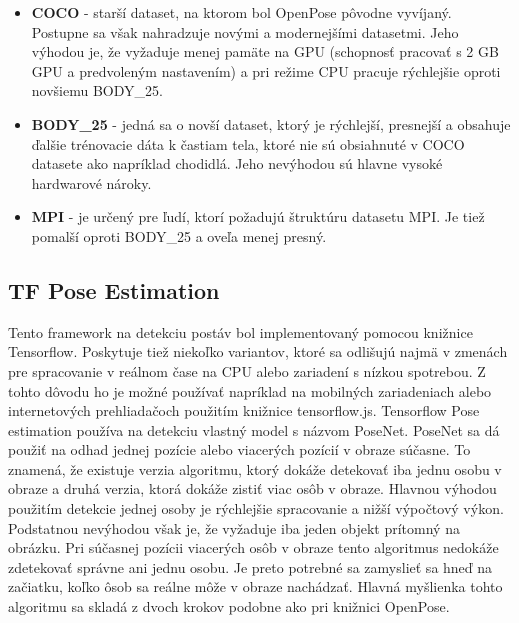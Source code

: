 \documentclass[slovak,master,dept460,male,cpp,cpdeclaration]{diploma}
\begin{document}
\begin{itemize}
\item \textbf{COCO} - starší dataset, na ktorom bol OpenPose pôvodne vyvíjaný. Postupne sa však nahradzuje novými a modernejšími datasetmi. Jeho výhodou je, že vyžaduje menej pamäte na GPU (schopnosť pracovať s 2 GB GPU a predvoleným nastavením) a pri režime CPU pracuje rýchlejšie oproti novšiemu BODY\_25.

\item \textbf{BODY\_25} - jedná sa o novší dataset, ktorý je rýchlejší, presnejší a obsahuje ďalšie trénovacie dáta k častiam tela, ktoré nie sú obsiahnuté v COCO datasete ako napríklad chodidlá. Jeho nevýhodou sú hlavne vysoké hardwarové nároky.

\item \textbf{MPI} - je určený pre ľudí, ktorí požadujú štruktúru datasetu MPI. Je tiež pomalší oproti BODY\_25 a oveľa menej presný.
\end{itemize}


\newpage
\subsection{TF Pose Estimation}
Tento framework na detekciu postáv bol implementovaný pomocou knižnice Tensorflow. Poskytuje tiež niekoľko variantov, ktoré sa odlišujú najmä v zmenách pre spracovanie v reálnom čase na CPU alebo zariadení s nízkou spotrebou. Z tohto dôvodu ho je  možné používať napríklad na mobilných zariadeniach alebo internetových prehliadačoch použitím knižnice tensorflow.js. Tensorflow Pose estimation používa na detekciu  vlastný model s názvom PoseNet. PoseNet sa dá použiť na odhad jednej pozície alebo viacerých pozícií v obraze súčasne. To znamená, že existuje verzia algoritmu, ktorý dokáže detekovať iba jednu osobu v obraze a druhá verzia, ktorá dokáže zistiť viac osôb v obraze. Hlavnou výhodou použitím detekcie jednej osoby je rýchlejšie spracovanie a nižší výpočtový výkon. Podstatnou nevýhodou však je, že vyžaduje iba jeden objekt prítomný na obrázku. Pri súčasnej pozícii viacerých osôb v obraze tento algoritmus nedokáže zdetekovať správne ani jednu osobu. Je preto potrebné sa zamyslieť sa  hneď na začiatku, koľko ôsob sa reálne môže v obraze nachádzať. Hlavná myšlienka tohto algoritmu sa skladá z dvoch krokov podobne ako pri knižnici OpenPose.
\end{document}
